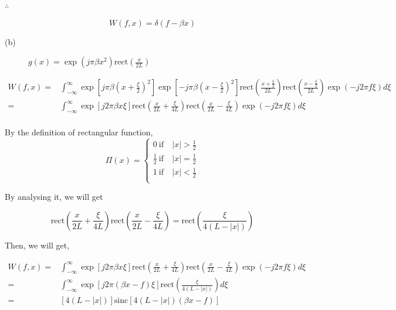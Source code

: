 \documentclass[a4paper,11pt]{article}
\begin{document}
\(\therefore\)

$$W(f,x) = \delta(f-\beta x) $$

\begin{description}
\item[{(b)}] \(g(x) = \exp(j\pi \beta x^2)\text{rect}\left(\frac{x}{2L}\right)\)
\end{description}

\begin{equation*}
\begin{split}
W(f,x) = & \int_{-\infty}^{\infty} \exp\left[j\pi\beta \left(x+\frac{\xi}{2}\right)^2\right]\exp\left[-j\pi\beta \left(x-\frac{\xi}{2}\right)^2\right]\text{rect}\left(\frac{x+\frac{\xi}{2}}{2L}\right)\text{rect}\left(\frac{x-\frac{\xi}{2}}{2L}\right)\exp(-j2\pi f\xi) d\xi \\
 = & \int_{-\infty}^{\infty} \exp\left[j2\pi \beta x\xi\right]\text{rect}\left(\frac{x}{2L}+\frac{\xi}{4L}\right)\text{rect}\left(\frac{x}{2L}-\frac{\xi}{4L}\right)\exp(-j2\pi f\xi) d\xi \\
\end{split}
\end{equation*}

By the definition of rectangular function,
\begin{equation}
\label{eq:orgce6ae2d}
\Pi(x) = \begin{cases}
0 ~ \text{if}~& |x|>\frac{1}{2} \\
\frac{1}{2} ~ \text{if}~& |x|=\frac{1}{2} \\
1 ~ \text{if}~& |x|<\frac{1}{2} \\
\end{cases}
\end{equation}

By analysing it, we will get

\begin{equation}
\text{rect}\left(\frac{x}{2L}+\frac{\xi}{4L}\right)\text{rect}\left(\frac{x}{2L}-\frac{\xi}{4L}\right) = \text{rect}\left(\frac{\xi}{4(L-|x|)}\right)
\end{equation}


Then, we will get,

\begin{equation*}
\begin{split}
W(f,x) = & \int_{-\infty}^{\infty} \exp\left[j2\pi \beta x\xi\right]\text{rect}\left(\frac{x}{2L}+\frac{\xi}{4L}\right)\text{rect}\left(\frac{x}{2L}-\frac{\xi}{4L}\right)\exp(-j2\pi f\xi) d\xi \\
= & \int_{-\infty}^{\infty} \exp\left[j2\pi (\beta x-f)\xi\right]\text{rect}\left(\frac{\xi}{4(L-|x|)}\right)d\xi \\
= & [4(L-|x|)]\text{sinc}[4(L-|x|)(\beta x-f)]
\end{split}
\end{equation*}
\end{document}
